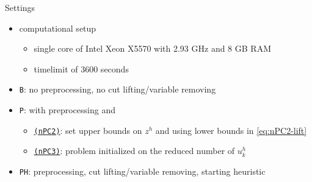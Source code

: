 \documentclass[utf8,aspectratio=1610,ngerman,english]{beamer}
\renewcommand{\emph}[1]{\textcolor{jkuGreen}{#1}}
\newcommand{\nPC}{\hyperref[eq:nPC]{\texttt{(nPC1)}}\xspace}
\newcommand{\nPCE}{\hyperref[eq:nPCE]{\texttt{(nPC3)}}\xspace}
\newcommand{\nPCY}{\hyperref[eq:nPCY]{\texttt{(nPC2)}}\xspace}
\newcommand{\noPP}{\texttt{B}\xspace}
\newcommand{\PP}{\texttt{P}\xspace}
\newcommand{\sH}{\texttt{PH}\xspace}
\begin{document}
\begin{frame}{Settings}
    \begin{itemize}
        \setlength\itemsep{1em}
        \item computational setup
              \begin{itemize}
                  \item single core of Intel Xeon X5570 with 2.93 GHz and 8 GB RAM
                  \item \emph{timelimit} of 3600 seconds
              \end{itemize}
        \item \noPP: no \emph{preprocessing}, no \emph{cut lifting/variable removing} \pause
        \item \PP: with \emph{preprocessing} and  \pause
              \begin{itemize}
                  \item \nPCY: set upper bounds on $z^h$ and using lower bounds in \eqref{eq:nPC2-lift}
                  \item \nPCE: problem initialized on the reduced number of $u_k^h$
              \end{itemize}\pause
        \item \sH: \emph{preprocessing}, \emph{cut lifting/variable removing}, \emph{starting heuristic}
    \end{itemize}
\end{frame}


\end{document}
